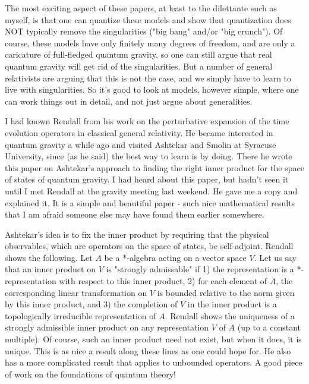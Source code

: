 The most exciting aspect of these papers, at least to the dilettante such as myself, is that one can quantize these models and show that quantization does NOT typically remove the singularities ("big bang" and/or "big crunch"). Of course, these models have only finitely many degrees of freedom, and are only a caricature of full-fledged quantum gravity, so one can still argue that real quantum gravity will get rid of the singularities. But a number of general relativists are arguing that this is not the case, and we simply have to learn to live with singularities. So it's good to look at models, however simple, where one can work things out in detail, and not just argue about generalities.


I had known Rendall from his work on the perturbative expansion of the time evolution operators in classical general relativity. He became interested in quantum gravity a while ago and visited Ashtekar and Smolin at Syracuse University, since (as he said) the best way to learn is by doing. There he wrote this paper on Ashtekar's approach to finding the right inner product for the space of states of quantum gravity. I had heard about this paper, but hadn't seen it until I met Rendall at the gravity meeting last weekend. He gave me a copy and explained it. It is a simple and beautiful paper - such nice mathematical results that I am afraid someone else may have found them earlier somewhere.

Ashtekar's idea is to fix the inner product by requiring that the physical observables, which are operators on the space of states, be self-adjoint. Rendall shows the following. Let $A$ be a *-algebra acting on a vector space $V$. Let us say that an inner product on $V$ is "strongly admissable" if 1) the representation is a *-representation with respect to this inner product, 2) for each element of $A$, the corresponding linear transformation on $V$ is bounded relative to the norm given by this inner product, and 3) the completion of $V$ in the inner product is a topologically irreducible representation of $A$. Rendall shows the uniqueness of a strongly admissible inner product on any representation $V$ of $A$ (up to a constant multiple). Of course, such an inner product need not exist, but when it does, it is unique. This is as nice a result along these lines as one could hope for. He also has a more complicated result that applies to unbounded operators. A good piece of work on the foundations of quantum theory!

